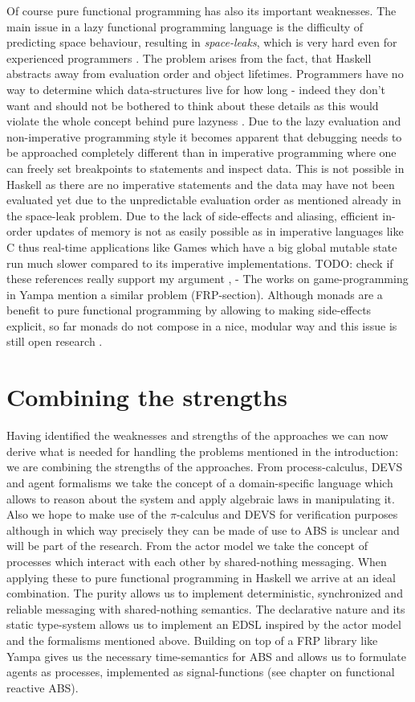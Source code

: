Of course pure functional programming has also its important weaknesses. The main issue in a lazy functional programming language is the difficulty of predicting space behaviour, resulting in \textit{space-leaks}, which is very hard even for experienced programmers \cite{hudak_history_2007}. The problem arises from the fact, that Haskell abstracts away from evaluation order and object lifetimes. Programmers have no way to determine which data-structures live for how long - indeed they don't want and should not be bothered to think about these details as this would violate the whole concept behind pure lazyness \cite{hudak_history_2007}.
Due to the lazy evaluation and non-imperative programming style it becomes apparent that debugging needs to be approached completely different than in imperative programming where one can freely set breakpoints to statements and inspect data. This is not possible in Haskell as there are no imperative statements and the data may have not been evaluated yet due to the unpredictable evaluation order as mentioned already in the space-leak problem.
Due to the lack of side-effects and aliasing, efficient in-order updates of memory is not as easily possible as in imperative languages like C thus real-time applications like Games which have a big global mutable state run much slower compared to its imperative implementations.
TODO: check if these references really support my argument \cite{mun_hon_functional_2005}, \cite{meisinger_game-engine-architektur_2010} - The works on game-programming in Yampa mention a similar problem (FRP-section).
Although monads are a benefit to pure functional programming by allowing to making side-effects explicit, so far monads do not compose in a nice, modular way and this issue is still open research \cite{hudak_history_2007}.

\section{Combining the strengths}
Having identified the weaknesses and strengths of the approaches we can now derive what is needed for handling the problems mentioned in the introduction: we are combining the strengths of the approaches. From process-calculus, DEVS and agent formalisms we take the concept of a domain-specific language which allows to reason about the system and apply algebraic laws in manipulating it. Also we hope to make use of the $\pi$-calculus and DEVS for verification purposes although in which way precisely they can be made of use to ABS is unclear and will be part of the research. From the actor model we take the concept of processes which interact with each other by shared-nothing messaging.
When applying these to pure functional programming in Haskell we arrive at an ideal combination. The purity allows us to implement deterministic, synchronized and reliable messaging with shared-nothing semantics. The declarative nature and its static type-system allows us to implement an EDSL inspired by the actor model and the formalisms mentioned above. Building on top of a FRP library like Yampa gives us the necessary time-semantics for ABS and allows us to formulate agents as processes, implemented as signal-functions (see chapter on functional reactive ABS).

